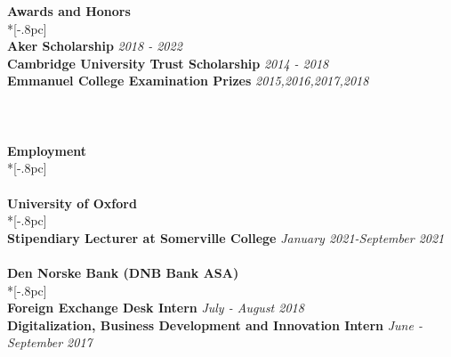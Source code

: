 \documentclass{article}
\begin{document}
{\large \bf Awards and Honors} \\*[-.8pc]
\underline{\hspace{1.8in}} \\
{\bf Aker Scholarship} \hfill {\it 2018 - 2022\/} \\
{\bf Cambridge University Trust Scholarship} \hfill {\it 2014 - 2018\/} \\
{\bf Emmanuel College Examination Prizes} \hfill {\it 2015,2016,2017,2018} \\
\\
\\
\\
{\large\bf Employment} \\*[-.8pc]
\underline{\hspace{1.4in}} 
\\
\\
{\bf University of Oxford} \\*[-.8pc]
\underline{\hspace{1.7in}} \\
{\bf Stipendiary Lecturer at Somerville College} \hfill {\it January 2021-September 2021\/} \\
\\
{\bf Den Norske Bank (DNB Bank ASA)} \\*[-.8pc]
\underline{\hspace{2.7in}} 
\\
{\bf Foreign Exchange Desk Intern} \hfill {\it July - August 2018\/} \\
{\bf Digitalization, Business Development and Innovation Intern} \hfill {\it June - September 2017\/} \\
\end{document}

